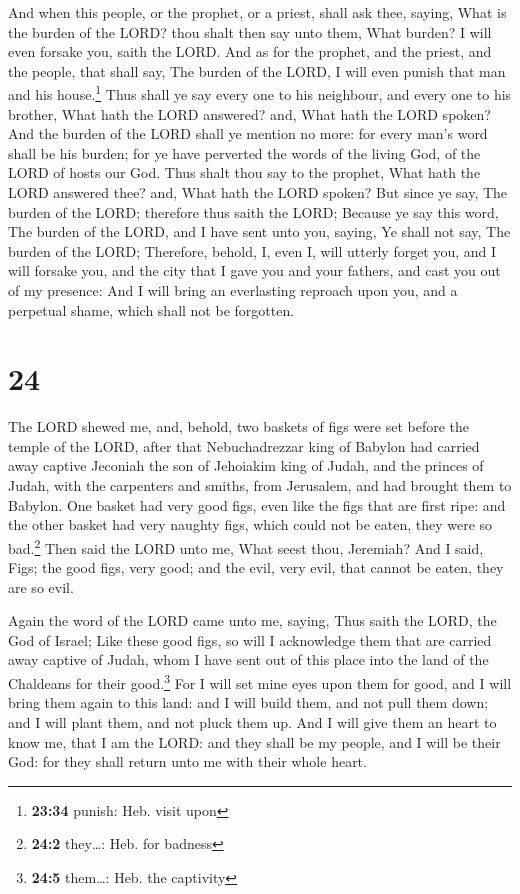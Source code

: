  And when this people, or the prophet, or a priest, shall
ask thee, saying, What is the burden of the LORD? thou shalt then say
unto them, What burden? I will even forsake you, saith the LORD.
 And as for the prophet, and the priest, and the people,
that shall say, The burden of the LORD, I will even punish that man and
his house.\footnote{\textbf{23:34} punish: Heb. visit upon}
 Thus shall ye say every one to his neighbour, and every
one to his brother, What hath the LORD answered? and, What hath the LORD
spoken?  And the burden of the LORD shall ye mention no
more: for every man's word shall be his burden; for ye have perverted
the words of the living God, of the LORD of hosts our God.
 Thus shalt thou say to the prophet, What hath the LORD
answered thee? and, What hath the LORD spoken?  But since
ye say, The burden of the LORD; therefore thus saith the LORD; Because
ye say this word, The burden of the LORD, and I have sent unto you,
saying, Ye shall not say, The burden of the LORD; 
Therefore, behold, I, even I, will utterly forget you, and I will
forsake you, and the city that I gave you and your fathers, and cast you
out of my presence:  And I will bring an everlasting
reproach upon you, and a perpetual shame, which shall not be forgotten.

\hypertarget{section-23}{%
\section{24}\label{section-23}}

 The LORD shewed me, and, behold, two baskets of figs were
set before the temple of the LORD, after that Nebuchadrezzar king of
Babylon had carried away captive Jeconiah the son of Jehoiakim king of
Judah, and the princes of Judah, with the carpenters and smiths, from
Jerusalem, and had brought them to Babylon.  One basket
had very good figs, even like the figs that are first ripe: and the
other basket had very naughty figs, which could not be eaten, they were
so bad.\footnote{\textbf{24:2} they\ldots: Heb. for badness}
 Then said the LORD unto me, What seest thou, Jeremiah?
And I said, Figs; the good figs, very good; and the evil, very evil,
that cannot be eaten, they are so evil.

 Again the word of the LORD came unto me, saying,
 Thus saith the LORD, the God of Israel; Like these good
figs, so will I acknowledge them that are carried away captive of Judah,
whom I have sent out of this place into the land of the Chaldeans for
their good.\footnote{\textbf{24:5} them\ldots: Heb. the captivity}
 For I will set mine eyes upon them for good, and I will
bring them again to this land: and I will build them, and not pull them
down; and I will plant them, and not pluck them up.  And I
will give them an heart to know me, that I am the LORD: and they shall
be my people, and I will be their God: for they shall return unto me
with their whole heart.

